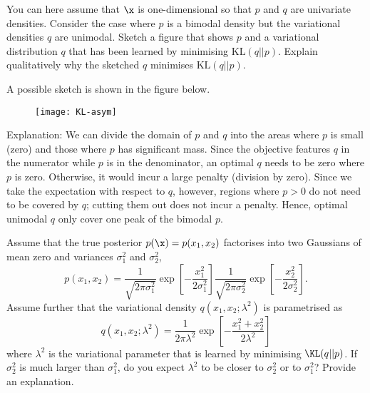 \begin{exenumerate}

\item You can here assume that $\x$ is one-dimensional so that $p$
  and $q$ are univariate densities. Consider the case where $p$ is
  a bimodal density but the variational densities $q$ are
  unimodal. Sketch a figure that shows $p$ and a variational
  distribution $q$ that has been learned by minimising $\text{KL}(q
  || p)$. Explain qualitatively why the sketched $q$ minimises
  $\text{KL}(q || p)$.

  \begin{solution}

  A possible sketch is shown in the figure below.

  \begin{figure}[h!]
    \centering
    \texttt{[image: KL-asym]}
  \end{figure}

  Explanation: We can divide the domain of $p$ and $q$ into the areas
  where $p$ is small (zero) and those where $p$ has significant
  mass. Since the objective features $q$ in the numerator while $p$ is
  in the denominator, an optimal $q$ needs to be zero where $p$ is
  zero. Otherwise, it would incur a large penalty (division by
  zero). Since we take the expectation with respect to $q$, however,
  regions where $p>0$ do not need to be covered by $q$; cutting them
  out does not incur a penalty. Hence, optimal unimodal $q$ only cover
  one peak of the bimodal $p$.
   
  \end{solution}

  
\item Assume that the true posterior $p(\x) = p(x_1, x_2)$ factorises into two Gaussians of mean zero and variances $\sigma_1^2$ and $\sigma_2^2$,
  \begin{equation}
    p(x_1,x_2) = \frac{1}{\sqrt{2\pi \sigma_1^2}} \exp\left[-\frac{x_1^2}{2 \sigma_1^2}\right]\frac{1}{\sqrt{2\pi \sigma_2^2}} \exp\left[-\frac{x_2^2}{2 \sigma_2^2}\right].
  \end{equation}
  Assume further that the variational density $q(x_1,x_2; \lambda^2)$ is parametrised as
  \begin{equation}
    q(x_1,x_2;\lambda^2) = \frac{1}{2\pi \lambda^2} \exp\left[-\frac{x_1^2+x_2^2}{2 \lambda^2}\right]
    \end{equation}
  where $\lambda^2$ is the variational parameter that is learned
  by minimising $ \KL(q || p)$. If $\sigma^2_2$ is much
  larger than $\sigma^2_1$, do you expect $\lambda^2$ to be closer to $\sigma_2^2$
  or to $\sigma_1^2$? Provide an explanation.


\end{exenumerate}
